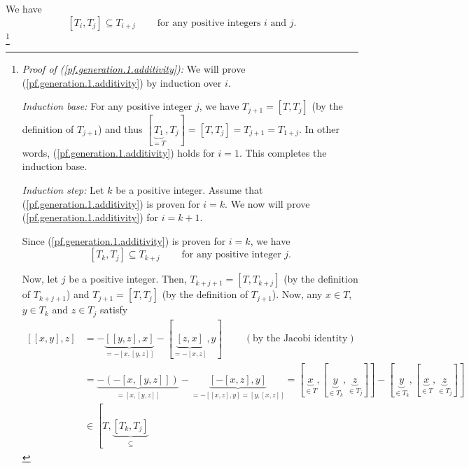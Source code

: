 \documentclass[etingof-lie.tex]{subfiles}
\begin{document}
We have%
\begin{equation}
\left[  T_{i},T_{j}\right]  \subseteq T_{i+j}\ \ \ \ \ \ \ \ \ \ \text{for any
positive integers }i\text{ and }j\text{.} \label{pf.generation.1.additivity}%
\end{equation}
\footnote{\textit{Proof of (\ref{pf.generation.1.additivity}):} We will prove
(\ref{pf.generation.1.additivity}) by induction over $i$.
\par
\textit{Induction base:} For any positive integer $j$, we have $T_{j+1}%
=\left[  T,T_{j}\right]  $ (by the definition of $T_{j+1}$) and thus $\left[
\underbrace{T_{1}}_{=T},T_{j}\right]  =\left[  T,T_{j}\right]  =T_{j+1}%
=T_{1+j}$. In other words, (\ref{pf.generation.1.additivity}) holds for $i=1$.
This completes the induction base.
\par
\textit{Induction step:} Let $k$ be a positive integer. Assume that
(\ref{pf.generation.1.additivity}) is proven for $i=k$. We now will prove
(\ref{pf.generation.1.additivity}) for $i=k+1$.
\par
Since (\ref{pf.generation.1.additivity}) is proven for $i=k$, we have%
\begin{equation}
\left[  T_{k},T_{j}\right]  \subseteq T_{k+j}\ \ \ \ \ \ \ \ \ \ \text{for any
positive integer }j\text{.} \label{pf.generation.1.additivity.2}%
\end{equation}
\par
Now, let $j$ be a positive integer. Then, $T_{k+j+1}=\left[  T,T_{k+j}\right]
$ (by the definition of $T_{k+j+1}$) and $T_{j+1}=\left[  T,T_{j}\right]  $
(by the definition of $T_{j+1}$). Now, any $x\in T$, $y\in T_{k}$ and $z\in
T_{j}$ satisfy%
\begin{align*}
\left[  \left[  x,y\right]  ,z\right]   &  =-\underbrace{\left[  \left[
y,z\right]  ,x\right]  }_{=-\left[  x,\left[  y,z\right]  \right]  }-\left[
\underbrace{\left[  z,x\right]  }_{=-\left[  x,z\right]  },y\right]
\ \ \ \ \ \ \ \ \ \ \left(  \text{by the Jacobi identity}\right) \\
&  =\underbrace{-\left(  -\left[  x,\left[  y,z\right]  \right]  \right)
}_{=\left[  x,\left[  y,z\right]  \right]  }-\underbrace{\left[  -\left[
x,z\right]  ,y\right]  }_{=-\left[  \left[  x,z\right]  ,y\right]  =\left[
y,\left[  x,z\right]  \right]  }=\left[  \underbrace{x}_{\in T},\left[
\underbrace{y}_{\in T_{k}},\underbrace{z}_{\in T_{j}}\right]  \right]
-\left[  \underbrace{y}_{\in T_{k}},\left[  \underbrace{x}_{\in T}%
,\underbrace{z}_{\in T_{j}}\right]  \right] \\
&  \in\left[  T,\underbrace{\left[  T_{k},T_{j}\right]  }_{\substack{\subseteq
}}
\end{align*}}
\end{document}
